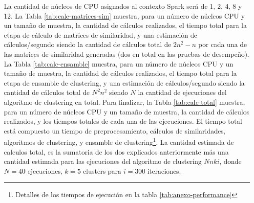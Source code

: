 \bigskip La cantidad de núcleos de CPU asignados al contexto Spark será de 1, 2, 4, 8 y 12. La Tabla \ref{tab:calc-matrices-sim} muestra, para un número de núcleos CPU y un tamaño de muestra, la cantidad de cálculos realizados, el tiempo total para la etapa de cálculo de matrices de similaridad, y una estimación de cálculos/segundo siendo la cantidad de cálculos total de \(2n^2-n\) por cada una de las matrices de similaridad generadas (dos en total en las pruebas de desempeño). La Tabla \ref{tab:calc-ensamble} muestra, para un número de núcleos CPU y un tamaño de muestra, la cantidad de cálculos realizados, el tiempo total para la etapa de ensamble de clustering, y una estimación de cálculos/segundo siendo la cantidad de cálculos total de \(N^2n^2\) siendo \(N\) la cantidad de ejecuciones del algoritmo de clustering en total. Para finalizar, la Tabla \ref{tab:calc-total}  muestra, para un número de núcleos CPU y un tamaño de muestra, la cantidad de cálculos realizados, y los tiempos totales de cada una de las ejecuciones. El tiempo total está compuesto un tiempo de preprocesamiento, cálculos de similaridades, algoritmos de clustering, y ensamble de clustering\footnote{Detalles de los tiempos de ejecución en la tabla \ref{tab:anexo-performance}}. La cantidad estimada de calculos total, es la sumatoria de los dos explicados anteriormente más una cantidad estimada para las ejecuciones del algoritmo de clustering \(Nnki\), donde \(N=40\) ejecuciones, \(k=5\) clusters para \(i=300\) iteraciones.

